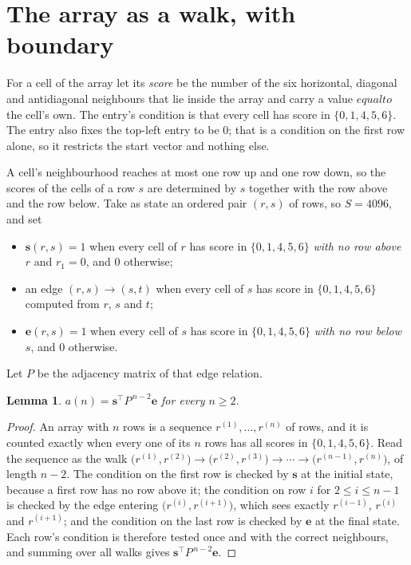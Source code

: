 \documentclass[11pt,a4paper]{article}
\theoremstyle{plain}
\newtheorem{lemma}[theorem]{Lemma}
\theoremstyle{definition}
\begin{document}
\section{The array as a walk, with boundary}

For a cell of the array let its \emph{score} be the number of the six horizontal, diagonal and antidiagonal neighbours that lie inside
the array and carry a value $equal to$ the cell's own. The entry's condition is that every cell
has score in $\{0,1,4,5,6\}$. The entry also fixes the top-left entry to be $0$; that is a condition on the first row alone, so it restricts the start vector and nothing else.

A cell's neighbourhood reaches at most one row up and one row down, so the scores of the
cells of a row $s$ are determined by $s$ together with the row above and the row below.
Take as state an ordered pair $(r,s)$ of rows, so $S=4096$, and set
\begin{itemize}
\item $\mathbf{s}(r,s)=1$ when every cell of $r$ has score in $\{0,1,4,5,6\}$ \emph{with no row
above $r$} and $r_1=0$, and $0$ otherwise;
\item an edge $(r,s)\to(s,t)$ when every cell of $s$ has score in $\{0,1,4,5,6\}$ computed from
$r$, $s$ and $t$;
\item $\mathbf{e}(r,s)=1$ when every cell of $s$ has score in $\{0,1,4,5,6\}$ \emph{with no row
below $s$}, and $0$ otherwise.
\end{itemize}
Let $P$ be the adjacency matrix of that edge relation.

\begin{lemma}\label{lem:walk}
$a(n)=\mathbf{s}^{\!\top}P^{\,n-2}\mathbf{e}$ for every $n\ge2$.
\end{lemma}

\begin{proof}
An array with $n$ rows is a sequence $r^{(1)},\dots,r^{(n)}$ of rows, and it is counted
exactly when every one of its $n$ rows has all scores in $\{0,1,4,5,6\}$. Read the sequence as the
walk $\bigl(r^{(1)},r^{(2)}\bigr)\to\bigl(r^{(2)},r^{(3)}\bigr)\to\cdots\to
\bigl(r^{(n-1)},r^{(n)}\bigr)$, of length $n-2$. The condition on the first row is
checked by $\mathbf{s}$ at the initial state, because a first row has no row above it; the
condition on row $i$ for $2\le i\le n-1$ is checked by the edge entering
$\bigl(r^{(i)},r^{(i+1)}\bigr)$, which sees exactly $r^{(i-1)}$, $r^{(i)}$ and
$r^{(i+1)}$; and the condition on the last row is checked by $\mathbf{e}$ at the final
state. Each row's condition is therefore tested once and with the correct neighbours, and
summing over all walks gives $\mathbf{s}^{\!\top}P^{\,n-2}\mathbf{e}$.
\end{proof}
\end{document}

